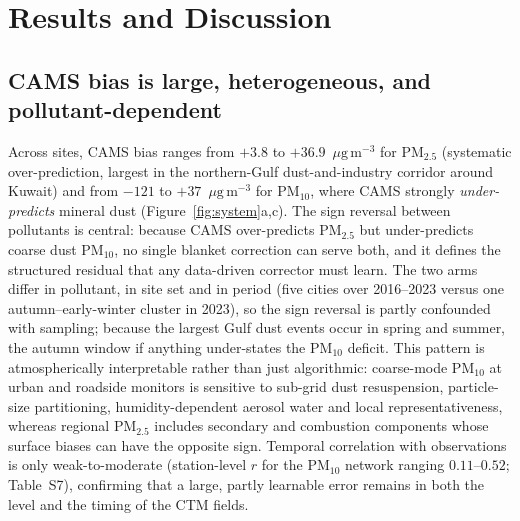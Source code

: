 \documentclass[review,times,authoryear]{elsarticle}
\newcommand*{\ugm}{\ensuremath{\mu\mathrm{g\,m^{-3}}}}
\newcommand*{\pmtf}{\ensuremath{\mathrm{PM_{2.5}}}}
\newcommand*{\pmten}{\ensuremath{\mathrm{PM_{10}}}}
\begin{document}
\section{Results and Discussion}

\subsection{CAMS bias is large, heterogeneous, and pollutant-dependent}
Across sites, CAMS bias ranges from $+3.8$ to $+36.9$~\ugm{} for \pmtf{} (systematic over-prediction, largest in the northern-Gulf dust-and-industry corridor around Kuwait) and from $-121$ to $+37$~\ugm{} for \pmten{}, where CAMS strongly \emph{under-predicts} mineral dust (Figure~\ref{fig:system}a,c). The sign reversal between pollutants is central: because CAMS over-predicts \pmtf{} but under-predicts coarse dust \pmten{}, no single blanket correction can serve both, and it defines the structured residual that any data-driven corrector must learn. The two arms differ in pollutant, in site set and in period (five cities over 2016--2023 versus one autumn--early-winter cluster in 2023), so the sign reversal is partly confounded with sampling; because the largest Gulf dust events occur in spring and summer, the autumn window if anything under-states the \pmten{} deficit. This pattern is atmospherically interpretable rather than just algorithmic: coarse-mode \pmten{} at urban and roadside monitors is sensitive to sub-grid dust resuspension, particle-size partitioning, humidity-dependent aerosol water and local representativeness, whereas regional \pmtf{} includes secondary and combustion components whose surface biases can have the opposite sign. Temporal correlation with observations is only weak-to-moderate (station-level $r$ for the \pmten{} network ranging $0.11$--$0.52$; Table~S7), confirming that a large, partly learnable error remains in both the level and the timing of the CTM fields.
\end{document}

